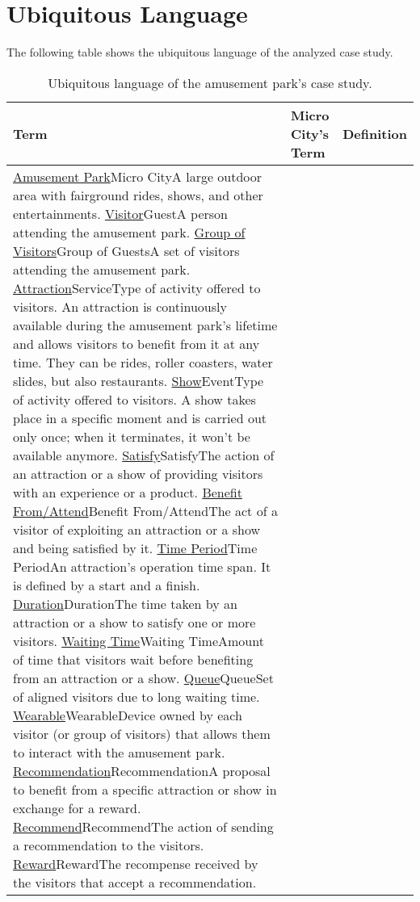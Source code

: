 \section{Ubiquitous Language}
\label{sec:ubiquitous-language}

The following table shows the ubiquitous language of the analyzed case study.

\begin{longtable}{|l|l|p{}|}
    \hline
    \textbf{Term} & \textbf{Micro City's Term} & \textbf{Definition}\\
    \hline
    \ul{Amusement Park}{Micro City}{A large outdoor area with fairground rides, shows, and other entertainments.}
    \ul{Visitor}{Guest}{A person attending the amusement park.}
    \ul{Group of Visitors}{Group of Guests}{A set of visitors attending the amusement park.}
    \ul{Attraction}{Service}{Type of activity offered to visitors. An attraction is continuously available during the amusement park's lifetime and allows visitors to benefit from it at any time. They can be rides, roller coasters, water slides, but also restaurants.}
    \ul{Show}{Event}{Type of activity offered to visitors. A show takes place in a specific moment and is carried out only once; when it terminates, it won't be available anymore.}
    \ul{Satisfy}{Satisfy}{The action of an attraction or a show of providing visitors with an experience or a product.}
    \ul{Benefit From/Attend}{Benefit From/Attend}{The act of a visitor of exploiting an attraction or a show and being satisfied by it.}
    \ul{Time Period}{Time Period}{An attraction's operation time span. It is defined by a start and a finish.}
    \ul{Duration}{Duration}{The time taken by an attraction or a show to satisfy one or more visitors.}
    \ul{Waiting Time}{Waiting Time}{Amount of time that visitors wait before benefiting from an attraction or a show.}
    \ul{Queue}{Queue}{Set of aligned visitors due to long waiting time.}
    \ul{Wearable}{Wearable}{Device owned by each visitor (or group of visitors) that allows them to interact with the amusement park.}
    \ul{Recommendation}{Recommendation}{A proposal to benefit from a specific attraction or show in exchange for a reward.}
    \ul{Recommend}{Recommend}{The action of sending a recommendation to the visitors.}
    \ul{Reward}{Reward}{The recompense received by the visitors that accept a recommendation.}
    \caption{Ubiquitous language of the amusement park's case study.}
    \label{tab:ul}
\end{longtable}
